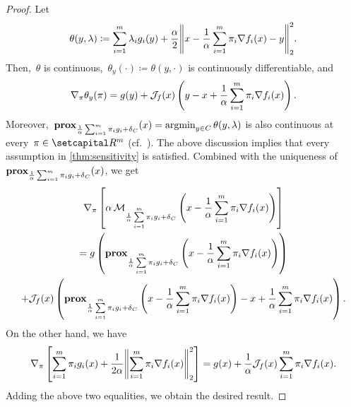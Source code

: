\documentclass[../../main]{subfiles}
\begin{document}
                        \begin{proof}
                            Let
                            \[
                                \theta(y, \lambda) \coloneqq \sum_{i = 1}^{m} \lambda_i g_i(y) + \frac{\alpha}{2} \norm*{x - \frac{1}{\alpha} \sum_{i = 1}^{m} \pi_i \nabla f_i(x) - y}_2^2
                            .\] 
                            Then,~$\theta$ is continuous,~$\theta_y(\cdot) \coloneqq \theta(y, \cdot)$ is continuously differentiable, and
                            \[
                                \nabla_\pi \theta_y(\pi) = g(y) + \mathcal{J}_{f}(x) \left( y - x + \frac{1}{\alpha} \sum_{i = 1}^{m} \pi_i \nabla f_i(x) \right) 
                            .\] 
                            Moreover,~$\operatorname{\mathbf{prox}}_{\frac{1}{\alpha} \sum_{i = 1}^{m} \pi_i g_i + \operatorname{\delta}_C}(x) = \operatorname*{argmin}_{y \in C} \theta(y, \lambda)$ is also continuous at every~$\pi \in \setR^m$ (cf.~\cite[Excercise 7.38]{Rockafellar1998}).
                            The above discussion implies that every assumption in \cref{thm:sensitivity} is satisfied.
                            Combined with the uniqueness of~$\operatorname{\mathbf{prox}}_{\frac{1}{\alpha} \sum_{i = 1}^{m} \pi_i g_i + \operatorname{\delta}_C}(x)$, we get
                            \begin{multline}
                                \nabla_\pi \left[ \alpha \envelope_{\frac{1}{\alpha} \sum\limits_{i = 1}^{m} \pi_i g_i + \indicator_C}\left( x - \frac{1}{\alpha} \sum_{i = 1}^{m} \pi_i \nabla f_i(x) \right) \right] \\ %
                                = g\left( \prox_{\frac{1}{\alpha} \sum\limits_{i = 1}^{m} \pi_i g_i + \indicator_C}\left( x - \frac{1}{\alpha} \sum_{i = 1}^{m} \pi_i \nabla f_i(x) \right) \right) \\
                                + \jdv{f}{x} \left( \prox_{\frac{1}{\alpha} \sum\limits_{i = 1}^{m} \pi_i g_i + \indicator_C}\left( x - \frac{1}{\alpha} \sum_{i = 1}^{m} \pi_i \nabla f_i(x) \right) - x + \frac{1}{\alpha} \sum_{i = 1}^{m} \pi_i \nabla f_i(x) \right) 
                            .\end{multline}
                            On the other hand, we have
                            \[
                                \nabla_\pi \left[ \sum_{i = 1}^{m} \pi_i g_i(x) + \frac{1}{2 \alpha} \norm*{\sum_{i = 1}^{m} \pi_i \nabla f_i(x)}_2^2 \right] = g(x) + \frac{1}{\alpha} \jdv{f}{x} \sum_{i = 1}^{m} \pi_i \nabla f_i(x) 
                            .\] 
                            Adding the above two equalities, we obtain the desired result.
                        \end{proof}
\end{document}
